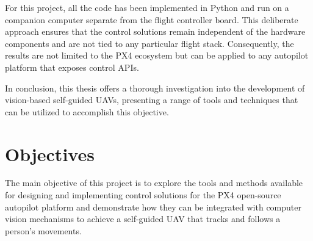 For this project, all the code has been implemented in Python and run on a companion computer separate from the flight controller board. This deliberate approach ensures that the control solutions remain independent of the hardware components and are not tied to any particular flight stack. Consequently, the results are not limited to the PX4 ecosystem but can be applied to any autopilot platform that exposes control APIs.

In conclusion, this thesis offers a thorough investigation into the development of vision-based self-guided UAVs, presenting a range of tools and techniques that can be utilized to accomplish this objective.


\section{Objectives}
\label{sec:objetives}

The main objective of this project is to explore the tools and methods available for designing and implementing control solutions for the PX4 open-source autopilot platform and demonstrate how they can be integrated with computer vision mechanisms to achieve a self-guided UAV that tracks and follows a person's movements.

